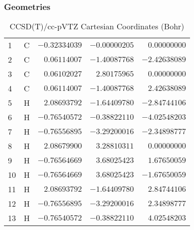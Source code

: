 \documentclass[10pt,oneside]{article}
\begin{document}
\subsubsection*{Geometries}
\begin{table}[h!]
\centering
\caption{CCSD(T)/cc-pVTZ Cartesian Coordinates (Bohr)}
\begin{tabular}{llrrr}
1  & C  & $-0.32334039$ & $-0.00000205$ & $ 0.00000000$ \\
2  & C  & $ 0.06114007$ & $-1.40087768$ & $-2.42638089$ \\
3  & C  & $ 0.06102027$ & $ 2.80175965$ & $ 0.00000000$ \\
4  & C  & $ 0.06114007$ & $-1.40087768$ & $ 2.42638089$ \\
5  & H  & $ 2.08693792$ & $-1.64409780$ & $-2.84744106$ \\
6  & H  & $-0.76540572$ & $-0.38822110$ & $-4.02548203$ \\
7  & H  & $-0.76556895$ & $-3.29200016$ & $-2.34898777$ \\
8  & H  & $ 2.08679900$ & $ 3.28810311$ & $ 0.00000000$ \\
9  & H  & $-0.76564669$ & $ 3.68025423$ & $ 1.67650059$ \\
10 & H  & $-0.76564669$ & $ 3.68025423$ & $-1.67650059$ \\
11 & H  & $ 2.08693792$ & $-1.64409780$ & $ 2.84744106$ \\
12 & H  & $-0.76556895$ & $-3.29200016$ & $ 2.34898777$ \\
13 & H  & $-0.76540572$ & $-0.38822110$ & $ 4.02548203$ \\
\end{tabular}
\end{table}
\end{document}
